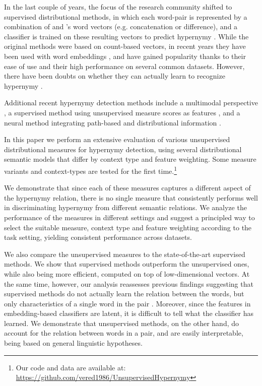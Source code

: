 \documentclass[11pt]{article}
\begin{document}
In the last couple of years, the focus of the research community shifted to supervised distributional methods, in which each  word-pair is represented by a combination of  and 's word vectors (e.g. concatenation or difference), and a classifier is trained on these resulting vectors to predict hypernymy \cite{baroni2012entailment,roller2014inclusive,weeds2014learning}. While the original methods were based on count-based vectors, in recent years they have been used with word embeddings \cite{mikolov2013distributed,pennington2014glove}, and have gained popularity thanks to their ease of use and their high performance on several common datasets. However, there have been doubts on whether they can actually learn to recognize hypernymy \cite{levy2015supervised}.

Additional recent hypernymy detection methods include a multimodal perspective \cite{kiela2015exploiting}, a supervised method using unsupervised measure scores as features \cite{santus2016nine}, and a neural method integrating path-based and distributional information \cite{shwartz2016improving}. 

In this paper we perform an extensive evaluation of various unsupervised distributional measures for hypernymy detection, using several distributional semantic models that differ by context type and feature weighting. Some measure variants and context-types are tested for the first time.\footnote{Our code and data are available at:\\\scriptsize{\url{https://github.com/vered1986/UnsupervisedHypernymy}}}

We demonstrate that since each of these measures captures a different aspect of the hypernymy relation, there is no single measure that consistently performs well in discriminating hypernymy from different semantic relations. We analyze the performance of the measures in different settings and suggest a principled way to select the suitable measure, context type and feature weighting according to the task setting, yielding consistent performance across datasets. 

We also compare the unsupervised measures to the state-of-the-art supervised methods. We show that supervised methods outperform the unsupervised ones, while also being more efficient, computed on top of low-dimensional vectors. At the same time, however, our analysis reassesses previous findings suggesting that supervised methods do not actually learn the relation between the words, but only characteristics of a single word in the pair \cite{levy2015supervised}. Moreover, since the features in embedding-based classifiers are latent, it is difficult to tell what the classifier has learned. We demonstrate that unsupervised methods, on the other hand, do account for the relation between words in a pair, and are easily interpretable, being based on general linguistic hypotheses.
\end{document}
